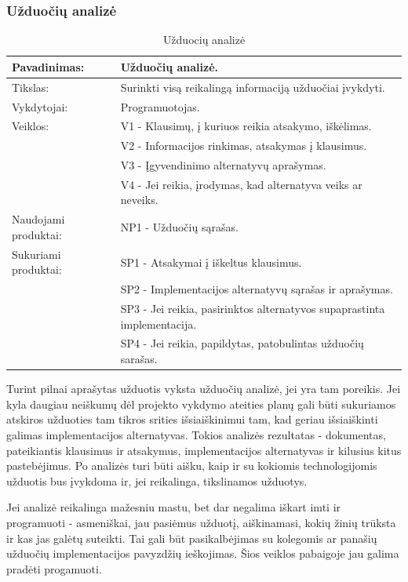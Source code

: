 \documentclass{VUMIFPSkursinis}
\begin{document}
	\subsubsection{Užduočių analizė}
	\begin{center}
		\begin{table}[ht]
			\caption{Užduocių analizė}
			\begin{tabular}{ | l | l | }
				\hline
				Pavadinimas:		& Užduočių analizė.								\\ \hline
				Tikslas:		& Surinkti visą reikalingą informaciją užduočiai įvykdyti.			\\ \hline
				Vykdytojai:		& Programuotojas.								\\ \hline
				Veiklos:		& V1 - Klausimų, į kuriuos reikia atsakymo, iškėlimas.				\\
							& V2 - Informacijos rinkimas, atsakymas į klausimus.				\\
							& V3 - Įgyvendinimo alternatyvų aprašymas.					\\
							& V4 - Jei reikia, įrodymas, kad alternatyva veiks ar neveiks.			\\ \hline
				Naudojami produktai:	& NP1 - Užduočių sąrašas. 							\\ \hline
				Sukuriami produktai:	& SP1 - Atsakymai į iškeltus klausimus.						\\
							& SP2 - Implementacijos alternatyvų sąrašas ir aprašymas.			\\
							& SP3 - Jei reikia, pasirinktos alternatyvos supaprastinta implementacija.	\\
							& SP4 - Jei reikia, papildytas, patobulintas užduočių sarašas.			\\ \hline
			\end{tabular}
		\end{table}
	\end{center}
	Turint pilnai aprašytas užduotis vyksta užduočių analizė, jei yra tam poreikis.
	Jei kyla daugiau neiškumų dėl projekto vykdymo ateities planų gali būti sukuriamos atskiros užduoties tam tikros srities išsiaiškinimui tam, kad geriau išsiaiškinti galimas implementacijos alternatyvas.
	Tokios analizės rezultatas - dokumentas, pateikiantis klausimus ir atsakymus, implementacijos alternatyvas ir kilusius kitus pastebėjimus.
	Po analizės turi būti aišku, kaip ir su kokiomis technologijomis užduotis bus įvykdoma ir, jei reikalinga, tikslinamos užduotys.
	\par
	Jei analizė reikalinga mažesniu mastu, bet dar negalima iškart imti ir programuoti - asmeniškai, jau pasiėmus užduotį, aiškinamasi, kokių žinių trūksta ir kas jas galėtų suteikti.
	Tai gali būt pasikalbėjimas su kolegomis ar panašių užduočių implementacijos pavyzdžių ieškojimas.
	Šios veiklos pabaigoje jau galima pradėti progamuoti.
\end{document}
